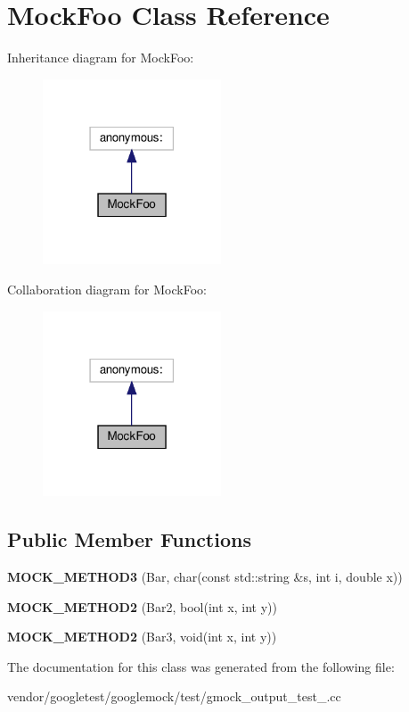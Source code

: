 \hypertarget{class_mock_foo}{}\section{Mock\+Foo Class Reference}
\label{class_mock_foo}


Inheritance diagram for Mock\+Foo\+:
\nopagebreak
\begin{figure}[H]
\begin{center}
\leavevmode
\includegraphics[width=150pt]{class_mock_foo__inherit__graph}
\end{center}
\end{figure}


Collaboration diagram for Mock\+Foo\+:
\nopagebreak
\begin{figure}[H]
\begin{center}
\leavevmode
\includegraphics[width=150pt]{class_mock_foo__coll__graph}
\end{center}
\end{figure}
\subsection*{Public Member Functions}
\begin{DoxyCompactItemize}
\item 
\mbox{\label{class_mock_foo_a8f323a65afd93c0605a02b278b101d18}} 
{\bfseries M\+O\+C\+K\+\_\+\+M\+E\+T\+H\+O\+D3} (Bar, char(const std\+::string \&s, int i, double x))
\item 
\mbox{\label{class_mock_foo_ae1d53263d5efcf38fda3990302fac6ab}} 
{\bfseries M\+O\+C\+K\+\_\+\+M\+E\+T\+H\+O\+D2} (Bar2, bool(int x, int y))
\item 
\mbox{\label{class_mock_foo_af1e0c374cadacdaa7ca69f9c38d85543}} 
{\bfseries M\+O\+C\+K\+\_\+\+M\+E\+T\+H\+O\+D2} (Bar3, void(int x, int y))
\end{DoxyCompactItemize}


The documentation for this class was generated from the following file\+:\begin{DoxyCompactItemize}
\item 
vendor/googletest/googlemock/test/gmock\+\_\+output\+\_\+test\+\_\+.\+cc\end{DoxyCompactItemize}
